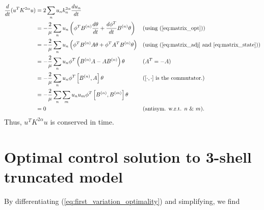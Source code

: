 \begin{align*}
\frac{d}{dt}(u^{T}K^{2\alpha}u )&= 2 \sum_{n} u_{n} k_{n}^{2\alpha}\frac{d u_{n}}{dt} & & \\
&=- \frac{2}{\mu} \sum_{n} u_{n} \left( \phi^{T}B^{(n)}\frac{d\theta}{dt} + \frac{d\phi^{T}}{dt}B^{(n)}\theta\right) & &\text{(using (\ref{eq:matrix_opt}))} \\
&=- \frac{2}{\mu} \sum_{n} u_{n} \left(\phi^{T}B^{(n)}A\theta + \phi^{T}A^{T}B^{(n)}\theta \right) & &\text{(using (\ref{eq:matrix_adj} and \ref{eq:matrix_state}))} \\
&=- \frac{2}{\mu} \sum_{n} u_{n} \phi^{T}\left(B^{(n)}A - AB^{(n)}\right)\theta  & & (A^{T}=-A) \\ 
&=- \frac{2}{\mu} \sum_{n} u_{n} \phi^{T}\left[B^{(n)},A\right]\theta  & & ([\cdot,\cdot] \text{ is the commutator.})\\
&=- \frac{2}{\mu} \sum_{n}\sum_{m} u_{n}u_{m} \phi^{T}\left[B^{(n)},B^{(m)}\right]\theta  & &\\
&=0 & & (\text{antisym. w.r.t. $n$ \& $m$}).
\end{align*}
Thus, $u^{T}K^{2\alpha}u$ is conserved in time. 


\section{Optimal control solution to 3-shell truncated model}
\label{appendix:oc3tm}


By differentiating (\ref{eq:first_variation_optimality}) and simplifying, we find

